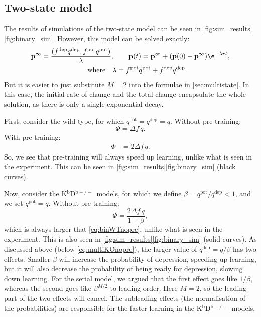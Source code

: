 \documentclass[10pt]{article}
\newcommand{\pr}{\mathbf{p}}
\newcommand{\eq}{\pr^\infty}
\newcommand{\pot}{^{\text{pot}}}
\newcommand{\dep}{^{\text{dep}}}
\newcommand{\KO}{K$^\mathrm{b}$D$^{\mathrm{b}-/-}$}
\begin{document}
\subsection{Two-state model}\label{sec:binary}




The results of simulations of the two-state model can be seen in
\autoref{fig:sim_results}\ref{fig:binary_sim}.
However, this model can be solved exactly:
%
\begin{multline}\label{eq:binarysol}
  \eq = \frac{(f\dep q\dep, f\pot q\pot)}{\lambda},
  \qquad
  \pr(t) = \eq + (\pr(0)-\eq)\e^{-\lambda rt},\\
  \qquad \text{where} \quad
  \lambda = f\pot q\pot + f\dep q\dep.
\end{multline}
%
But it is easier to just substitute $M=2$ into the formulae in \autoref{sec:multistate}.
In this case, the initial rate of change and the total change encapsulate the whole solution, as there is only a single exponential decay.

First, consider the wild-type, for which $q\pot=q\dep=q$.
Without pre-training:
%
\begin{equation}\label{eq:binWTnopre}
  \Phi = {\Delta f}\, q.
\end{equation}
%
With pre-training:
%
\begin{equation}\label{eq:binWTpre}
\begin{aligned}
  \Phi &= 2{\Delta f}\, q.
\end{aligned}
\end{equation}
%
So, we see that pre-training will always speed up learning, unlike what is seen in the experiment.
This can be seen in
\autoref{fig:sim_results}\ref{fig:binary_sim} %
(black curves).

Now, consider the \KO\ models, for which we define $\beta=q\pot/q\dep<1$, and we set $q\pot=q$.
Without pre-training:
%
\begin{equation}\label{eq:binKOnopre}
  \Phi = \frac{2{\Delta f}\, q}{1+\beta},
\end{equation}
%
which is always larger that \eqref{eq:binWTnopre}, unlike what is seen in the experiment.
This is also seen in
\autoref{fig:sim_results}\ref{fig:binary_sim} %
(solid curves).
As discussed above (below \eqref{eq:multiKOnopre}), the larger value of $q\dep=q/\beta$ has two effects.
Smaller $\beta$ will increase the probability of depression, speeding up learning, but it will also decrease the probability of being ready for depression, slowing down learning.
For the serial model, we argued that the first effect goes like $1/\beta$, whereas the second goes like $\beta^{M/2}$ to leading order.
Here $M=2$, so the leading part of the two effects will cancel.
The subleading effects (the normalisation of the probabilities) are responsible for the faster learning in the \KO\ models.
\end{document}
